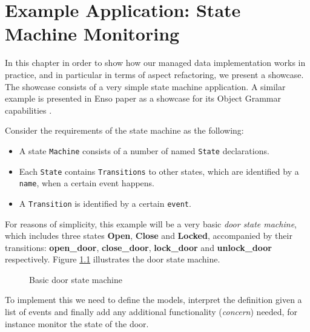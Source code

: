 
\chapter{Example Application: State Machine Monitoring}\label{Example Application}
In this chapter in order to show how our managed data implementation works in practice, and in particular in terms of aspect refactoring, we present a showcase.
The showcase consists of a very simple state machine application.
A similar example is presented in Enso paper as a showcase for its Object Grammar capabilities \cite{storm2012object}.

Consider the requirements of the state machine as the following: 
\begin{itemize}
	\item A state \texttt{Machine} consists of a number of named \texttt{State} declarations.

	\item Each \texttt{State} contains \texttt{Transitions} to other states, which are identified by a \texttt{name}, when a certain event happens.

	\item A \texttt{Transition} is identified by a certain \texttt{event}.
\end{itemize}

For reasons of simplicity, this example will be a very basic \textit{door state machine}, which includes three states \textbf{Open}, \textbf{Close} and \textbf{Locked}, accompanied by their transitions: \textbf{open\_door}, \textbf{close\_door}, \textbf{lock\_door} and \textbf{unlock\_door} respectively.
Figure \ref{fig:State_machine} illustrates the door state machine.

\begin{figure}[H]
	\centering
  	\caption{Basic door state machine}
  	\label{fig:State_machine}
\end{figure}

To implement this we need to define the models, interpret the definition given a list of events and finally add any additional functionality (\textit{concern}) needed, for instance monitor the state of the door.


